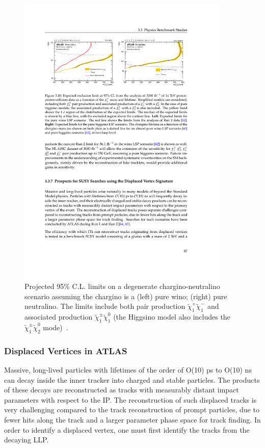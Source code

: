 %
\begin{figure}[t]\begin{center}
\includegraphics[width=0.9\textwidth]{figures/atlas-tdr-030-fig3-40.pdf}
\caption{Projected 95\% C.L. limits on a degenerate chargino-neutralino scenario assuming the chargino is a (left) pure wino; (right) pure neutralino. The limits include both pair production $\tilde\chi_1^+\tilde\chi_1^-$ and associated production $\tilde\chi_1^\pm\tilde\chi_1^0$ (the Higgsino model also includes the $\tilde\chi_1^\pm\tilde\chi_2^0$ mode)~\cite{Collaboration:2285585}. }
\label{fig:ATLAS_DT2}
\end{center}
\end{figure}

\subsubsection{Displaced Vertices in ATLAS}

Massive, long-lived particles with lifetimes of the order of O(10) ps to O(10) ns can decay inside the inner tracker into charged and stable particles. The products of these decays are reconstructed as tracks with measurably distant impact parameters with respect to the IP. The reconstruction of such displaced tracks is very challenging compared to the track reconstruction of prompt particles, due to fewer hits along the track and a larger parameter phase space for track finding. In order to identify a displaced vertex, one must first identify the tracks from the decaying LLP.


